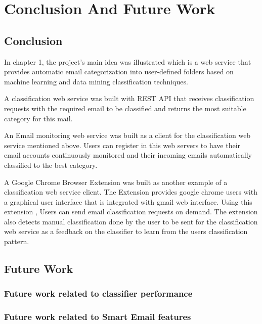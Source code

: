 
\chapter{Conclusion And Future Work} %

\label{Chapter7} %




\section{Conclusion}
In chapter 1, the project's main idea was illustrated which
is a web service that provides automatic email categorization into
user-defined folders based on machine learning and data mining
classification techniques.

A classification web service was built with REST API \cite{REST} that receives
classification requests with the required email to be classified and returns
the most suitable category for this mail.

An Email monitoring web service was built as a client for the classification
web service mentioned above. Users can register in this web servers to have
their email accounts continuously monitored and their incoming emails automatically
classified to the best category.

A Google Chrome Browser \cite{CHROME} Extension was built as another example of a
classification web service client. The Extension provides google chrome users
with a graphical user interface that is integrated with gmail web interface.
Using this extension , Users can send email classification requests on demand.
The extension also detects manual classification done by the user to be sent
for the classification web service as a feedback on the classifier to learn
from the users classification pattern.
\section{Future Work}

\subsection{Future work related to classifier performance}
\subsection{Future work related to Smart Email features}





